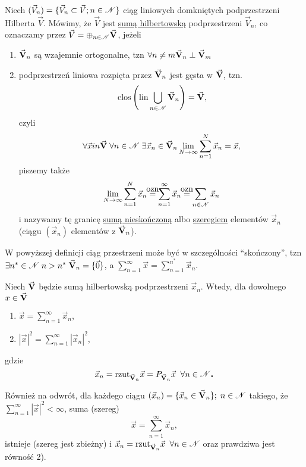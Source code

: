\begin{mydef}
   Niech $(\vec{V}_n) = \{\vec{V}_n \subset \vec{V}; n \in \mathscr{N}\}$ ciąg liniowych domkniętych podprzestrzeni Hilberta $\vec{V}$. Mówimy, że $\vec{V}$ jest \underline{sumą hilbertowską} podprzestrzeni $\vec{V}_n$, co oznaczamy przez $\vec{V} = \oplus_{n\in\mathscr{N}} \vec{\mathbf{V}}$, jeżeli
   \begin{enumerate}
    \item $\vec{\mathbf{V}}_n$ są wzajemnie ortogonalne, tzn $\forall n\neq m \vec{\mathbf{V}}_n \perp \vec{\mathbf{V}}_m$
    \item podprzestrzeń liniowa rozpięta przez $\vec{\mathbf{V}}_n$ jest gęsta w $\vec{\mathbf{V}}$, tzn.
   \[\,\textnormal{clos} \left(\normalfont\mbox{lin} \bigcup\limits_{n \in \mathscr{N}} \vec{\mathbf{V}}_n\right) = \vec{\mathbf{V}},
   \]
    czyli
    \[\forall \vec{x} in \vec{\mathbf{V}}\; \forall n \in \mathscr{N} \; \exists \vec{x}_n \in \vec{\mathbf{V}}_n \lim\limits_{N\to\infty} \sum\limits_{n=1}^N \vec{x}_n = \vec{x},\]
    piszemy także
    \[\lim\limits_{N\to\infty} \sum\limits_{n=1}^N \vec{x}_n \ozn \sum\limits_{n=1}^{\infty} \vec{x}_n \ozn \sum\limits_{n\in\nat}\vec{x}_n\]
    i nazywamy tę granicę \underline{sumą nieskończoną} albo \underline{szeregiem} elementów $\vec{x}_n$ (ciągu $(\vec{x}_n)$ elementów z $\vec{\mathbf{V}}_n$).
   \end{enumerate}
\end{mydef}

\begin{info}
   W powyższej definicji ciąg przestrzeni może być w szczególności ``skończony'', tzn $\exists n^* \in \mathscr{N} \; n > n^* \; \vec{\mathbf{V}}_n = \{\vec{0}\}$, a $\sum\limits_{n=1}^{\infty} \vec{x} = \sum\limits_{n=1}^{n^*} \vec{x}_n$.
\end{info}

\begin{tw}
   Niech $\vec{\mathbf{V}}$ będzie sumą hilbertowską podprzestrzeni $\vec{x}_n$. Wtedy, dla dowolnego $x \in \vec{\mathbf{V}}$
   \begin{enumerate}
    \item $\vec{x} = \sum\limits_{n=1}^{\infty} \vec{x}_n$,
    \item $|\vec{x}|^2 = \sum\limits_{n=1}^{\infty} |\vec{x}_n|^2$,
   \end{enumerate}
   gdzie 
   \[\vec{x}_n = \normalfont\mbox{rzut}_{\vec{\mathbf{V}}_n} \vec{x} = P_{\vec{\mathbf{V}}_n} \vec{x} \;\; \forall n \in \mathscr{N} \mbox{\large\bfseries .}\]

   Również na odwrót, dla każdego ciągu $(\vec{x}_n) = \{\vec{x}_n \in \vec{\mathbf{V}}_n\}; \; n \in \mathscr{N}$ takiego, że $\sum\limits_{n=1}^{\infty} |\vec{x}|^2 < \infty$, suma (szereg)
   \[\vec{x} = \sum\limits_{n=1}^{\infty} \vec{x}_n,\]
   istnieje (szereg jest zbieżny) i $\vec{x}_n = \normalfont\mbox{rzut}_{\vec{\mathbf{V}}_n} \vec{x}\;\; \forall n \in \mathscr{N}$ oraz prawdziwa jest równość 2).
\end{tw}

